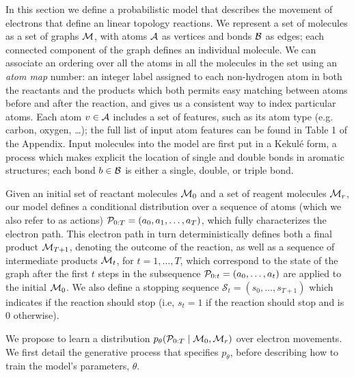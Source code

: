


In this section we define a probabilistic model that describes the movement of electrons that define an linear topology reactions.
We represent a set of molecules as a set of graphs ${\mathcal{M}}$, with atoms ${\mathcal{A}}$ as vertices and bonds ${\mathcal{B}}$ as edges;
each connected component of the graph defines an individual molecule.
We can associate an ordering over all the atoms in all the molecules in the set using an {\em atom map} number:
an integer label assigned to each non-hydrogen atom in both the reactants and the products which 
both permits easy matching between atoms before and after the reaction, and
gives us a consistent way to index particular atoms.
Each atom $v \in {\mathcal{A}}$ includes a set of features, such as its atom type (e.g. carbon, oxygen, \dots); the full list of input atom features can be found in Table 1 of the Appendix.
Input molecules into the model are first put in a Kekul\'e form, a process which makes explicit the location of single and double bonds in aromatic structures;
each bond $b \in {\mathcal{B}}$ is either a single, double, or triple bond.


Given an initial set of reactant molecules ${\mathcal{M}}_0$ and a set of reagent molecules ${\mathcal{M}}_r$, 
our model defines a conditional distribution over a sequence of atoms (which we also refer to as actions) ${\mathcal{P}}_{0:T} = (a_0, a_1, \ldots, a_T)$,
which fully characterizes the electron path.
This electron path in turn deterministically defines both a final product ${\mathcal{M}}_{T+1}$, 
denoting the outcome of the reaction,
as well as a sequence of intermediate products ${\mathcal{M}}_t$, for $t = 1,\dots,T$,
which correspond to the state of the graph after the first $t$ steps in the subsequence ${\mathcal{P}}_{0:t} = (a_0, \dots, a_t)$ are applied to the initial ${\mathcal{M}}_0$. We also define a stopping sequence $\mathcal{S}_t = (s_0, \ldots, s_{T+1})$ which indicates if the reaction should stop (i.e, $s_t\!=\!1$ if the reaction should stop and is $0$ otherwise). 

We propose to learn a distribution $p_\theta( {\mathcal{P}}_{0:T} \mid {\mathcal{M}}_0, {\mathcal{M}}_r)$ over electron movements. 
We first detail the generative process %
that specifies $p_\theta$, before describing how to train the model's parameters, $\theta$.


